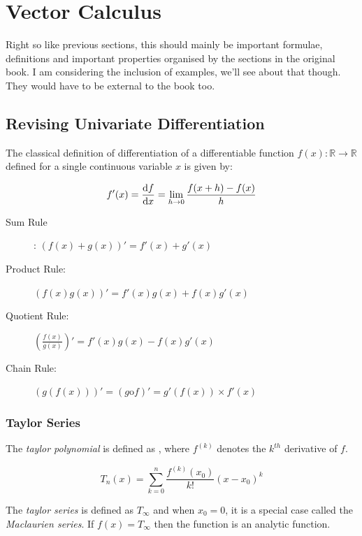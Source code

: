 \chapter{Vector Calculus}

Right so like previous sections, this should mainly be important formulae, definitions and important properties organised by the sections in the original book. I am considering the inclusion of examples, we'll see about that though. They would have to be external to the book too.

\section{Revising Univariate Differentiation}

The classical definition of differentiation of a differentiable function $f(x) : \mathbb{R} \rightarrow \mathbb{R}$ defined for a single continuous variable $x$ is given by:

\begin{equation}
    f'(x) = \frac{\mathrm{d}f}{\mathrm{d}x} = 
    \lim_{h \rightarrow 0} \frac{f(x + h) - f(x)}{h}
\end{equation}

\begin{description}
    \item[Sum Rule]: $(f(x) + g(x))' = f'(x) + g'(x)$
    \item[Product Rule:] $(f(x)g(x))' = f'(x)g(x) + f(x)g'(x)$
    \item[Quotient Rule:] $\left( \frac{f(x)}{g(x)} \right)' = f'(x)g(x) - f(x)g'(x)$
    \item[Chain Rule:] $(g(f(x)))' = (g \text{o}  f)' = g'(f(x)) \times f'(x)$   
\end{description}

\subsection{Taylor Series}

The \textit{taylor polynomial} is defined as , where $f^{(k)}$ denotes the $k^{th}$ derivative of $f$.

\begin{equation}
    T_n(x) = \sum_{k=0}^{n} \frac{f^{(k)}(x_0)}{k!}(x - x_0)^k
    \label{eq:taylor-polynomial} 
\end{equation}

The \textit{taylor series} is defined as $T_{\infty}$ and when $x_0 = 0$, it is a special case called the \textit{Maclaurien series}. If $f(x) = T_\infty$ then the function is an analytic function. 


